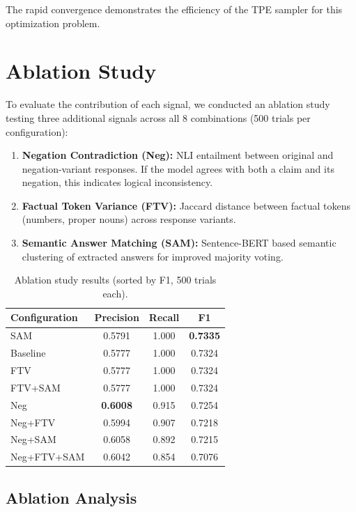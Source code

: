 The rapid convergence demonstrates the efficiency of the TPE sampler for this optimization problem.

\section{Ablation Study}

To evaluate the contribution of each signal, we conducted an ablation study testing three additional signals across all 8 combinations (500 trials per configuration):

\begin{enumerate}
    \item \textbf{Negation Contradiction (Neg):} NLI entailment between original and negation-variant responses. If the model agrees with both a claim and its negation, this indicates logical inconsistency.
    \item \textbf{Factual Token Variance (FTV):} Jaccard distance between factual tokens (numbers, proper nouns) across response variants.
    \item \textbf{Semantic Answer Matching (SAM):} Sentence-BERT based semantic clustering of extracted answers for improved majority voting.
\end{enumerate}

\begin{table}[!htbp]
    \centering
    \caption{Ablation study results (sorted by F1, 500 trials each).}
    \label{tab:ablation}
    \begin{tabular}{lccc}
        \toprule
        Configuration & Precision & Recall & F1 \\
        \midrule
        SAM & 0.5791 & 1.000 & \textbf{0.7335} \\
        Baseline & 0.5777 & 1.000 & 0.7324 \\
        FTV & 0.5777 & 1.000 & 0.7324 \\
        FTV+SAM & 0.5777 & 1.000 & 0.7324 \\
        Neg & \textbf{0.6008} & 0.915 & 0.7254 \\
        Neg+FTV & 0.5994 & 0.907 & 0.7218 \\
        Neg+SAM & 0.6058 & 0.892 & 0.7215 \\
        Neg+FTV+SAM & 0.6042 & 0.854 & 0.7076 \\
        \bottomrule
    \end{tabular}
\end{table}

\subsection{Ablation Analysis}

